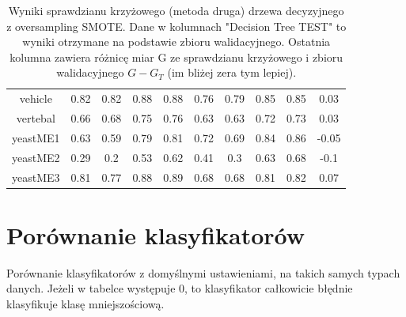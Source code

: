 \begin{table}[H]
\begin{center}
{\begin{tabular}{|c|c|c|c|c|c|c|c|c|c|}
			vehicle&0.82&0.82&0.88&0.88&0.76&0.79&0.85&0.85&0.03\\%
			vertebal&0.66&0.68&0.75&0.76&0.63&0.63&0.72&0.73&0.03\\%
			yeastME1&0.63&0.59&0.79&0.81&0.72&0.69&0.84&0.86&{-}0.05\\%
			yeastME2&0.29&0.2&0.53&0.62&0.41&0.3&0.63&0.68&{-}0.1\\%
			yeastME3&0.81&0.77&0.88&0.89&0.68&0.68&0.81&0.82&0.07\\%
			\hline%
		\end{tabular}}%
			\caption{Wyniki sprawdzianu krzyżowego (metoda druga) drzewa decyzyjnego z oversampling SMOTE. Dane w kolumnach "Decision Tree TEST" to wyniki otrzymane na podstawie zbioru walidacyjnego. Ostatnia kolumna zawiera różnicę  miar G ze sprawdzianu krzyżowego i zbioru walidacyjnego $G-G_T$ (im bliżej zera tym lepiej).}
			\label{CVoversampling2}
	\end{center}
\end{table}

\section{Porównanie klasyfikatorów}

Porównanie klasyfikatorów z domyślnymi ustawieniami, na takich samych typach danych. Jeżeli w tabelce występuje 0, to klasyfikator całkowicie błędnie klasyfikuje klasę mniejszościową.

